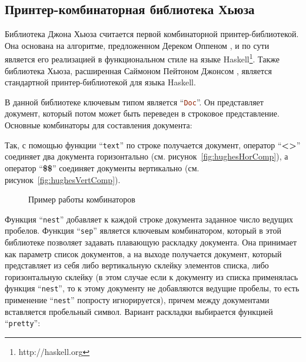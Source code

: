 \subsection{Принтер-комбинаторная библиотека Хьюза}

Библиотека Джона Хьюза\cite{hughes} считается первой комбинаторной принтер-библиотекой.
Она основана на алгоритме, предложенном Дереком Оппеном \cite{oppen}, и по сути является
его реализацией в функциональном стиле на языке Haskell\footnote{http://haskell.org}.
Также библиотека Хьюза, расширенная Саймоном Пейтоном Джонсом \cite{peytonJones},
является стандартной принтер-библиотекой для языка Haskell.

В данной библиотеке ключевым типом является “\lstinline[language=Haskell]{Doc}”.
Он представляет документ, который потом может быть переведен в строковое представление.
Основные комбинаторы для составления документа:


Так, с помощью функции “\lstinline[language=Haskell]{text}” по строке получается документ,
оператор “\textbf{<>}” соединяет два документа горизонтально (см. рисунок~\ref{fig:hughesHorComp}),
а оператор “\textbf{\$\$}” соединяет документы вертикально (см. рисунок~\ref{fig:hughesVertComp}).

\begin{figure}[ht]
	\quad

	\caption{Пример работы комбинаторов}
\end{figure}

Функция “\lstinline[language=Haskell]{nest}” добавляет к каждой строке документа
заданное число ведущих пробелов. Функция “\lstinline[language=Haskell]{sep}”
является ключевым комбинатором, который в этой библиотеке позволяет задавать плавающую
раскладку документа. Она принимает как параметр список документов, а на выходе
получается документ, который представляет из себя либо вертикальную склейку элементов
списка, либо горизонтальную склейку (в этом случае если к документу из списка применялась
функция “\lstinline[language=Haskell]{nest}”, то к этому документу не добавляются ведущие
пробелы, то есть применение “\lstinline[language=Haskell]{nest}” попросту игнорируется),
причем между документами вставляется пробельный символ. Вариант раскладки выбирается
функцией “\lstinline[language=Haskell]{pretty}”:

